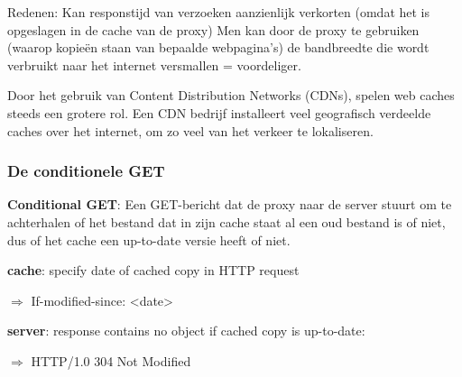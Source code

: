 \noindent Redenen:
\bi
\itf Kan responstijd van verzoeken aanzienlijk verkorten (omdat het is opgeslagen in de cache van de proxy)
\itf Men kan door de proxy te gebruiken (waarop kopieën staan van bepaalde webpagina’s) de bandbreedte die wordt verbruikt naar het internet versmallen = voordeliger.
\ei

\noindent Door het gebruik van Content Distribution Networks (CDNs), spelen web caches steeds een grotere rol. Een CDN bedrijf installeert veel geografisch verdeelde caches over het internet, om zo veel van het verkeer te lokaliseren.

\subsubsection{De conditionele GET}

\textbf{Conditional GET}: Een GET-bericht dat de proxy naar de server stuurt om te achterhalen of het bestand dat in zijn cache staat al een oud bestand is of niet, dus of het cache een up-to-date versie heeft of niet.

\noindent \textbf{cache}: specify date of cached copy in HTTP request

\noindent $\Rightarrow$ If-modified-since: <date>

\noindent \textbf{server}: response contains no object if cached copy is up-to-date:

\noindent $\Rightarrow$ HTTP/1.0 304 Not Modified
